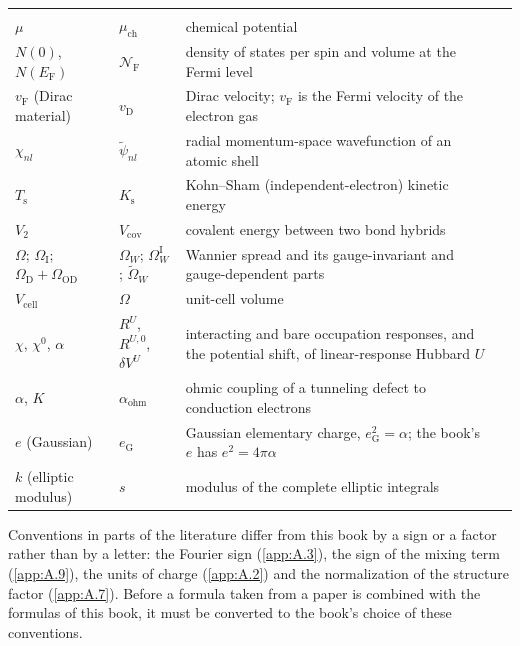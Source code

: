 {\begin{longtable}{@{}>{\raggedright\arraybackslash}p{}>{\raggedright\arraybackslash}p{}>{\raggedright\arraybackslash}p{}>{\raggedright\arraybackslash}p{}@{}}
\addlinespace
\multicolumn{4}{@{}l}{\itshape Electrons in crystals}\\*
$\mu$ & $\mu_{\mathrm{ch}}$ & chemical potential & {sec:2.5} \\
$N(0)$, $N(E_{\mathrm{F}})$ & $\mathcal{N}_{\mathrm{F}}$ & density of states per spin and volume at the Fermi level & {sec:2.5} \\
$v_{\mathrm{F}}$ (Dirac material) & $v_{\mathrm{D}}$ & Dirac velocity; $v_{\mathrm{F}}$ is the Fermi velocity of the electron gas & {sec:7.3} \\
$\chi_{nl}$ & $\tilde\psi_{nl}$ & radial momentum-space wavefunction of an atomic shell & {sec:2.2} \\
$T_{\mathrm{s}}$ & $K_{\mathrm{s}}$ & Kohn--Sham (independent-electron) kinetic energy & {sec:3.4} \\
$V_2$ & $V_{\mathrm{cov}}$ & covalent energy between two bond hybrids & {sec:3.2} \\
$\Omega$; $\Omega_{\mathrm{I}}$; $\Omega_{\mathrm{D}} + \Omega_{\mathrm{OD}}$ & $\Omega_W$; $\Omega_W^{\mathrm{I}}$; $\tilde\Omega_W$ & Wannier spread and its gauge-invariant and gauge-dependent parts & {sec:3.6} \\
$V_{\mathrm{cell}}$ & $\Omega$ & unit-cell volume & {sec:3.1} \\
$\chi$, $\chi^0$, $\alpha$ & $R^U$, $R^{U,0}$, $\delta V^U$ & interacting and bare occupation responses, and the potential shift, of linear-response Hubbard $U$ & {app:E.9} \\
$\alpha$, $K$ & $\alpha_{\mathrm{ohm}}$ & ohmic coupling of a tunneling defect to conduction electrons & {sec:16.8} \\
$e$ (Gaussian) & $e_{\mathrm{G}}$ & Gaussian elementary charge, $e_{\mathrm{G}}^2 = \alpha$; the book's $e$ has $e^2 = 4\pi\alpha$ & {app:A.2} \\
$k$ (elliptic modulus) & $s$ & modulus of the complete elliptic integrals & {app:C.8} \\
\end{longtable}
}

Conventions in parts of the literature differ from this book by a sign or a factor rather than by a letter: the Fourier sign (\cref{app:A.3}), the sign of the mixing term (\cref{app:A.9}), the units of charge (\cref{app:A.2}) and the normalization of the structure factor (\cref{app:A.7}). Before a formula taken from a paper is combined with the formulas of this book, it must be converted to the book's choice of these conventions.
